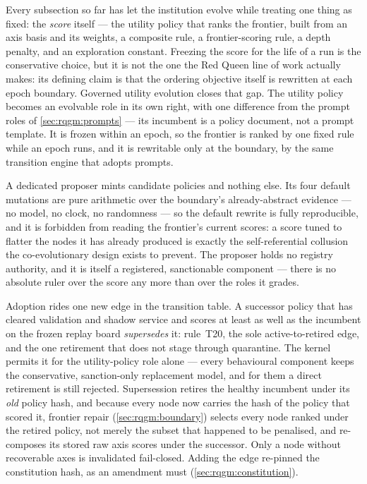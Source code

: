 Every subsection so far has let the institution evolve while treating one
thing as fixed: the \emph{score} itself --- the utility policy that ranks
the frontier, built from an axis basis and its weights, a composite rule,
a frontier-scoring rule, a depth penalty, and an exploration constant.
Freezing the score for the life of a run is the conservative choice, but
it is not the one the Red Queen line of work \cite{iacob2026red} actually
makes: its defining claim is that the ordering objective itself is
rewritten at each epoch boundary. Governed utility evolution closes that
gap. The utility policy becomes an evolvable role in its own right, with
one difference from the prompt roles of \cref{sec:rqgm:prompts} --- its
incumbent is a policy document, not a prompt template. It is frozen
within an epoch, so the frontier is ranked by one fixed rule while an
epoch runs, and it is rewritable only at the boundary, by the same
transition engine that adopts prompts.

A dedicated proposer mints candidate policies and nothing else. Its four
default mutations are pure arithmetic over the boundary's
already-abstract evidence --- no model, no clock, no randomness --- so
the default rewrite is fully reproducible, and it is forbidden from
reading the frontier's current scores: a score tuned to flatter the nodes
it has already produced is exactly the self-referential collusion the
co-evolutionary design exists to prevent. The proposer holds no registry
authority, and it is itself a registered, sanctionable component --- there
is no absolute ruler over the score any more than over the roles it
grades.

Adoption rides one new edge in the transition table. A successor policy
that has cleared validation and shadow service and scores at least as
well as the incumbent on the frozen replay board \emph{supersedes} it:
rule~T20, the sole active-to-retired edge, and the one retirement that
does not stage through quarantine. The kernel permits it for the
utility-policy role alone --- every behavioural component keeps the
conservative, sanction-only replacement model, and for them a direct
retirement is still rejected. Supersession retires the healthy incumbent
under its \emph{old} policy hash, and because every node now carries the
hash of the policy that scored it, frontier repair
(\cref{sec:rqgm:boundary}) selects every node ranked under the retired
policy, not merely the subset that happened to be penalised, and
re-composes its stored raw axis scores under the successor. Only a
node without recoverable axes is invalidated fail-closed.
Adding the edge re-pinned the constitution hash, as an amendment must
(\cref{sec:rqgm:constitution}).

